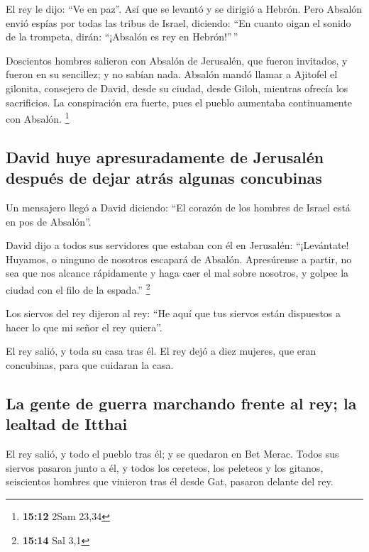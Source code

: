 \begin{paracol}{2}
 El rey le dijo: ``Ve en paz''. Así que se levantó y se
dirigió a Hebrón.  Pero Absalón envió espías por todas
las tribus de Israel, diciendo: ``En cuanto oigan el sonido de la
trompeta, dirán: ``¡Absalón es rey en Hebrón!''\,''

 Doscientos hombres salieron con Absalón de Jerusalén,
que fueron invitados, y fueron en su sencillez; y no sabían nada.
 Absalón mandó llamar a Ajitofel el gilonita, consejero
de David, desde su ciudad, desde Giloh, mientras ofrecía los
sacrificios. La conspiración era fuerte, pues el pueblo aumentaba
continuamente con Absalón. \footnote{\textbf{15:12} 2Sam 23,34}

\hypertarget{david-huye-apresuradamente-de-jerusaluxe9n-despuuxe9s-de-dejar-atruxe1s-algunas-concubinas}{%
\subsection{David huye apresuradamente de Jerusalén después de dejar
atrás algunas
concubinas}\label{david-huye-apresuradamente-de-jerusaluxe9n-despuuxe9s-de-dejar-atruxe1s-algunas-concubinas}}

 Un mensajero llegó a David diciendo: ``El corazón de los
hombres de Israel está en pos de Absalón''.

 David dijo a todos sus servidores que estaban con él en
Jerusalén: ``¡Levántate! Huyamos, o ninguno de nosotros escapará de
Absalón. Apresúrense a partir, no sea que nos alcance rápidamente y haga
caer el mal sobre nosotros, y golpee la ciudad con el filo de la
espada.'' \footnote{\textbf{15:14} Sal 3,1}

 Los siervos del rey dijeron al rey: ``He aquí que tus
siervos están dispuestos a hacer lo que mi señor el rey quiera''.

 El rey salió, y toda su casa tras él. El rey dejó a diez
mujeres, que eran concubinas, para que cuidaran la casa.

\hypertarget{la-gente-de-guerra-marchando-frente-al-rey-la-lealtad-de-itthai}{%
\subsection{La gente de guerra marchando frente al rey; la lealtad de
Itthai}\label{la-gente-de-guerra-marchando-frente-al-rey-la-lealtad-de-itthai}}

 El rey salió, y todo el pueblo tras él; y se quedaron en
Bet Merac.  Todos sus siervos pasaron junto a él, y todos
los cereteos, los peleteos y los gitanos, seiscientos hombres que
vinieron tras él desde Gat, pasaron delante del rey.


\end{paracol}
